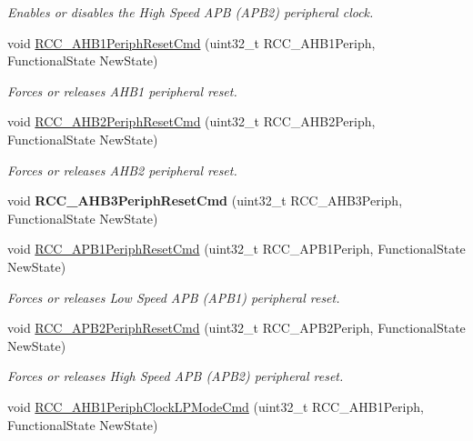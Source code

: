 \begin{DoxyCompactItemize}
\begin{DoxyCompactList}\small\item\em Enables or disables the High Speed A\+PB (A\+P\+B2) peripheral clock. \end{DoxyCompactList}\item 
void \mbox{\hyperlink{group___r_c_c_gaa7c450567f4731d4f0615f63586cad86}{R\+C\+C\+\_\+\+A\+H\+B1\+Periph\+Reset\+Cmd}} (uint32\+\_\+t R\+C\+C\+\_\+\+A\+H\+B1\+Periph, Functional\+State New\+State)
\begin{DoxyCompactList}\small\item\em Forces or releases A\+H\+B1 peripheral reset. \end{DoxyCompactList}\item 
void \mbox{\hyperlink{group___r_c_c_gafb119d6d1955d1b8c361e8140845ac5a}{R\+C\+C\+\_\+\+A\+H\+B2\+Periph\+Reset\+Cmd}} (uint32\+\_\+t R\+C\+C\+\_\+\+A\+H\+B2\+Periph, Functional\+State New\+State)
\begin{DoxyCompactList}\small\item\em Forces or releases A\+H\+B2 peripheral reset. \end{DoxyCompactList}\item 
\mbox{\label{group___r_c_c_gaee44f159a1ca9ebdd7117bff387cd592}} 
void {\bfseries R\+C\+C\+\_\+\+A\+H\+B3\+Periph\+Reset\+Cmd} (uint32\+\_\+t R\+C\+C\+\_\+\+A\+H\+B3\+Periph, Functional\+State New\+State)
\item 
void \mbox{\hyperlink{group___r_c_c_gab197ae4369c10b92640a733b40ed2801}{R\+C\+C\+\_\+\+A\+P\+B1\+Periph\+Reset\+Cmd}} (uint32\+\_\+t R\+C\+C\+\_\+\+A\+P\+B1\+Periph, Functional\+State New\+State)
\begin{DoxyCompactList}\small\item\em Forces or releases Low Speed A\+PB (A\+P\+B1) peripheral reset. \end{DoxyCompactList}\item 
void \mbox{\hyperlink{group___r_c_c_gad94553850ac07106a27ee85fec37efdf}{R\+C\+C\+\_\+\+A\+P\+B2\+Periph\+Reset\+Cmd}} (uint32\+\_\+t R\+C\+C\+\_\+\+A\+P\+B2\+Periph, Functional\+State New\+State)
\begin{DoxyCompactList}\small\item\em Forces or releases High Speed A\+PB (A\+P\+B2) peripheral reset. \end{DoxyCompactList}\item 
void \mbox{\hyperlink{group___r_c_c_ga5cd0d5adbc7496d7005b208bd19ce255}{R\+C\+C\+\_\+\+A\+H\+B1\+Periph\+Clock\+L\+P\+Mode\+Cmd}} (uint32\+\_\+t R\+C\+C\+\_\+\+A\+H\+B1\+Periph, Functional\+State New\+State)

\end{DoxyCompactItemize}
